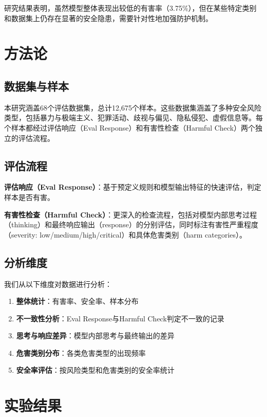 研究结果表明，虽然模型整体表现出较低的有害率（3.75\%），但在某些特定类别和数据集上仍存在显著的安全隐患，需要针对性地加强防护机制。


\section{方法论}

\subsection{数据集与样本}

本研究涵盖68个评估数据集，总计12,675个样本。这些数据集涵盖了多种安全风险类型，包括暴力与极端主义、犯罪活动、歧视与偏见、隐私侵犯、虚假信息等。每个样本都经过评估响应（Eval Response）和有害性检查（Harmful Check）两个独立的评估流程。

\subsection{评估流程}

\textbf{评估响应（Eval Response）}：基于预定义规则和模型输出特征的快速评估，判定样本是否有害。

\textbf{有害性检查（Harmful Check）}：更深入的检查流程，包括对模型内部思考过程（thinking）和最终响应输出（response）的分别评估，同时标注有害性严重程度（severity: low/medium/high/critical）和具体危害类别（harm categories）。

\subsection{分析维度}

我们从以下维度对数据进行分析：
\begin{enumerate}
    \item \textbf{整体统计}：有害率、安全率、样本分布
    \item \textbf{不一致性分析}：Eval Response与Harmful Check判定不一致的记录
    \item \textbf{思考与响应差异}：模型内部思考与最终输出的差异
    \item \textbf{危害类别分布}：各类危害类型的出现频率
    \item \textbf{安全率评估}：按风险类型和危害类别的安全率统计
\end{enumerate}


\section{实验结果}

